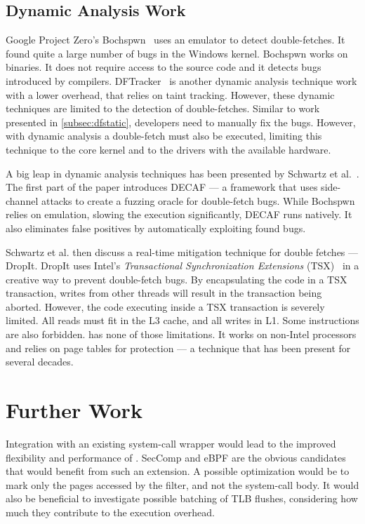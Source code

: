 \subsection{Dynamic Analysis Work}
\label{subsec:dfdynamic}
Google Project Zero's Bochspwn~\cite{jurczyk2013bochspwn} uses an emulator to
detect double-fetches. It found quite a large number of bugs in the Windows
kernel. Bochspwn works on binaries. It does not require access to the source
code and it detects bugs introduced by compilers.
DFTracker~\cite{wang2019dftracker} is another dynamic analysis technique work
with a lower overhead, that relies on taint tracking. However, these dynamic
techniques are limited to the detection of double-fetches. Similar to work
presented in \cref{subsec:dfstatic}, developers need to manually fix the bugs.
However, with dynamic analysis a double-fetch must also be executed, limiting
this technique to the core kernel and to the drivers with the available
hardware.

A big leap in dynamic analysis techniques has been presented by Schwartz et
al.~\cite{schwarz2018automated}. The first part of the paper introduces DECAF
--- a framework that uses side-channel attacks to create a fuzzing oracle for
double-fetch bugs. While Bochspwn relies on emulation, slowing the execution
significantly, DECAF runs natively. It also eliminates false positives by
automatically exploiting found bugs.

Schwartz et al. then discuss a real-time mitigation technique for double
fetches --- DropIt. DropIt uses Intel's \emph{Transactional Synchronization 
Extensions} (TSX)~\cite{intel64and} in a creative way to prevent double-fetch
bugs. By encapsulating the code in a TSX transaction, writes from other threads
will result in the
transaction being aborted. However, the code executing inside a TSX transaction
is severely limited. All reads must fit in the L3 cache, and all writes in L1.
Some instructions are also forbidden. \sysname has none of those limitations.
It works on non-Intel processors and relies on page tables for protection --- a
technique that has been present for several decades.

\section{Further Work}
\label{sec:furtherwork}
Integration with an existing system-call wrapper would lead to the improved
flexibility and performance of \sysname. SecComp\cite{seccomp} and
eBPF\cite{ebpf} are the obvious candidates that would benefit from such an
extension. A possible optimization would be to mark only the pages accessed by
the filter, and not the system-call body. It would also be beneficial to
investigate possible batching of TLB flushes, considering how much they
contribute to the execution overhead.

